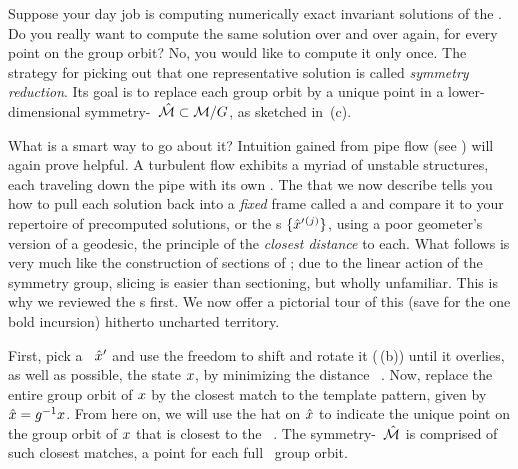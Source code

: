 \documentclass[aip,cha,reprint,
secnumarabic,
nofootinbib, tightenlines,
nobibnotes, showkeys, showpacs,
groupedaddress
]{revtex4-1}
\begin{document}
Suppose your day job is computing numerically exact invariant solutions
of the \NSe. Do you really want to compute the same solution over and
over again, for every point on the group orbit? No, you would like to
compute it only once. The strategy for picking out that one
representative solution is called \emph{symmetry reduction}. Its goal is
to replace each group orbit by a unique point in a lower-dimensional
symmetry-\reducedsp\ $\hat{\cal M} \subset {\cal M}/G$, as sketched in
\,(c).

What is a smart way to go about it? Intuition gained from pipe flow (see
) will again prove helpful. A turbulent flow
exhibits a myriad of unstable structures, each traveling down the pipe
with its own {\phaseVel}. The
\mslices{} that we now
describe tells you how to pull each solution back into a {\em fixed}
frame called a \emph{\slice} and compare it to your repertoire of
precomputed solutions, or the \template s $\{{\hat{x}'}{}^{(j)}\}$, using a
poor geometer's version of a geodesic, the principle of the \emph{closest
distance} to each. What follows is very much like the construction of
sections of ; due to the linear action of the symmetry
group, slicing is easier than sectioning, but wholly unfamiliar. This is
why we reviewed the \PoincSec s first. We now offer a pictorial tour of
this (save for the one bold incursion) hitherto uncharted
territory.

First, pick a \template\ ${\hat{x}'}$ and use the freedom to shift and
rotate it (\,(b)) until it overlies, as well as
possible, the state $x$, by minimizing the distance
\beq
\Norm{\ssp - \LieEl(\gSpace)\,\slicep}
\, .
Now, replace the entire group orbit of $x$ by the closest match to the
template pattern, given by $\hat{x}=g^{-1}x$. From here on, we
will use the hat on $\hat{x}$ to indicate the unique point on the group
orbit of $x$ that is closest to the \template\ \slicep. The
symmetry-\reducedsp\ $\hat{\cal M}$ is comprised of such closest matches, a
point for each full \statesp\ group orbit.
\end{document}
